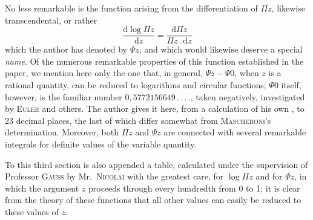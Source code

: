 No less remarkable is the function arising from the differentiation of $\Pi z$, likewise transcendental, or rather
\[
\frac{\mathrm{d}\log\Pi z}{\mathrm{d}z}=\frac{\mathrm{d}\Pi z}{\Pi z\,.\,\mathrm{d}z}
\]
which the author has denoted by $\Psi z$, and which would likewise deserve a special \textit{name}. Of the numerous remarkable properties of this function established in the paper, we mention here only the one that, in general, $\Psi z-\Psi 0$, when $z$ is a rational quantity, can be reduced to logarithms and circular functions; $\Psi 0$ itself, however, is the familiar number $0{,}5772156649\,.\,.\,.\,.$, taken negatively, investigated by \textsc{Euler} and others. The author gives it here, from a calculation of his own%
, to 23 decimal places, the last of which differ somewhat from \textsc{Mascheroni}'s determination. Moreover, both $\Pi z$ and $\Psi z$ are connected with several remarkable integrals for definite values of the variable quantity.

To this third section is also appended a table, calculated under the supervision of Professor \textsc{Gauss} by Mr.\ \textsc{Nicolai} with the greatest care, for $\log\Pi z$ and for $\Psi z$, in which the argument $z$ proceeds through every hundredth from 0 to 1; it is clear from the theory of these functions that all other values can easily be reduced to these values of $z$.

